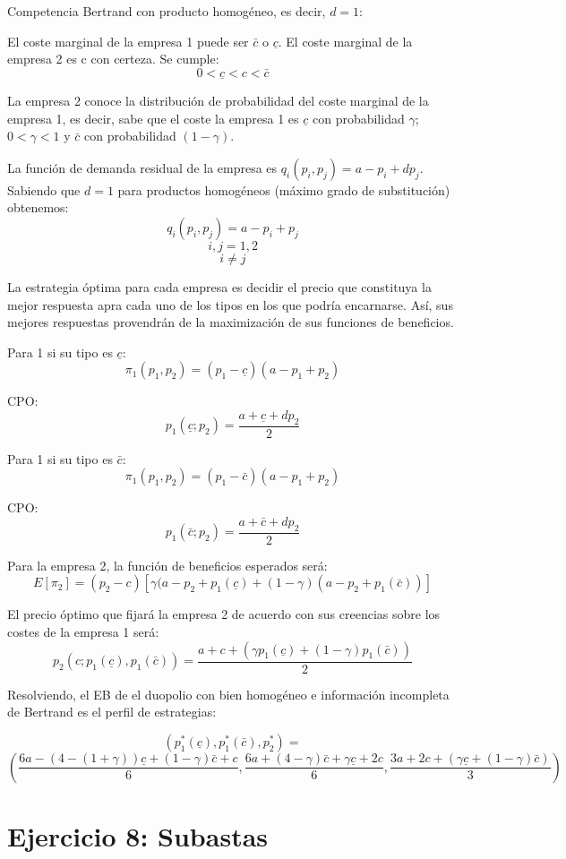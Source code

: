 \documentclass{article}
\begin{document}
Competencia Bertrand con producto homog\'eneo, es decir, $d=1$:

El coste marginal de la empresa 1 puede ser $\bar{c}$ o $\underline{c}$.
El coste marginal de la empresa 2 es c con certeza.
Se cumple:
$$0<\underline{c}<c<\bar{c}$$

La empresa 2 conoce la distribuci\'on de probabilidad del coste marginal de la empresa 1, es decir, sabe que el coste la empresa 1 es $\underline{c}$ con probabilidad $\gamma$; $0<\gamma<1$ y $\bar{c}$ con probabilidad $(1-\gamma)$.

La funci\'on de demanda residual de la empresa es $q_i(p_i,p_j)=a-p_i+dp_j$. Sabiendo que $d=1$ para productos homog\'eneos (m\'aximo grado de substituci\'on) obtenemos:
$$q_i(p_i,p_j)=a-p_i+p_j$$ $$i,j=1,2$$ $$i\neq j$$

La estrategia \'optima para cada empresa es decidir el precio que constituya la mejor respuesta apra cada uno de los tipos  en los que podr\'ia encarnarse. As\'i, sus mejores respuestas provendr\'an de la maximizaci\'on de sus funciones de beneficios.

Para 1 si su tipo es $\underline{c}$:
$$\pi_1(p_1,p_2)=(p_1-\underline{c})(a-p_1+p_2)$$

CPO:
$$p_1(\underline{c};p_2)=\frac{a+\underline{c}+dp_2}{2}$$

Para 1 si su tipo es $\bar{c}$:
$$\pi_1(p_1,p_2)=(p_1-\bar{c})(a-p_1+p_2)$$

CPO:
$$p_1(\bar{c};p_2)=\frac{a+\bar{c}+dp_2}{2}$$

Para la empresa 2, la funci\'on de beneficios esperados ser\'a:
$$E[\pi_2]=(p_2-c)[\gamma(a-p_2+p_1(\underline{c})+(1-\gamma)(a-p_2+p_1(\bar{c}))]$$

El precio \'optimo que fijar\'a la empresa 2 de acuerdo con sus creencias sobre los costes de la empresa 1 ser\'a:
$$p_2(c;p_1(\underline{c}),p_1(\bar{c}))=\frac{a+c+(\gamma p_1(\underline{c})+(1-\gamma)p_1(\bar{c}))}{2}$$

Resolviendo, el EB de el duopolio con bien homog\'eneo e informaci\'on incompleta de Bertrand es el perfil de estrategias:

$${(p_1^*(\underline{c}),p_1^*(\bar{c}),p_2^*)}=$$
\hspace{2cm}
$${(\frac{6a-(4-(1+\gamma))\underline{c}+(1-\gamma)\bar{c}+c}{6},\frac{6a+(4-\gamma)\bar{c}+\gamma \underline{c}+2c}{6},\frac{3a+2c+(\gamma \underline{c}+(1-\gamma)\bar{c})}{3})}$$




\section{Ejercicio 8: Subastas}
\end{document}
